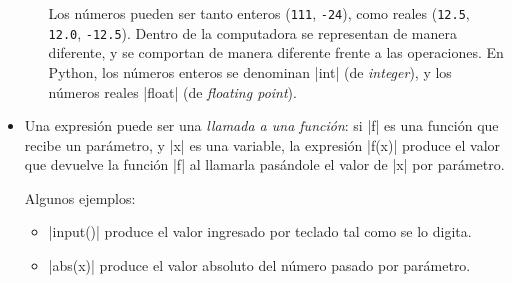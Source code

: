 \begin{itemize}
\begin{itemize}
\begin{observacion}
Los números pueden ser tanto enteros (\lstinline!111!, \lstinline!-24!), como
reales (\lstinline!12.5!, \lstinline!12.0!, \lstinline!-12.5!). Dentro de la
computadora se representan de manera diferente, y se comportan de manera
diferente frente a las operaciones. En Python, los números enteros se denominan
|int| (de \emph{integer}), y los números reales |float| (de \emph{floating
point}).
\end{observacion}

\end{itemize}

\item Una expresión puede ser una \emph{llamada a una función}: si |f| es una
    función que recibe un parámetro, y |x| es una variable, la expresión |f(x)|
    produce el valor que devuelve la función |f| al llamarla pasándole el valor
    de |x| por parámetro.

    Algunos ejemplos:

\begin{itemize}
\item |input()| produce el valor ingresado por teclado tal como se lo digita.
\item |abs(x)| produce el valor absoluto del número pasado por parámetro.
\end{itemize}

\end{itemize}




